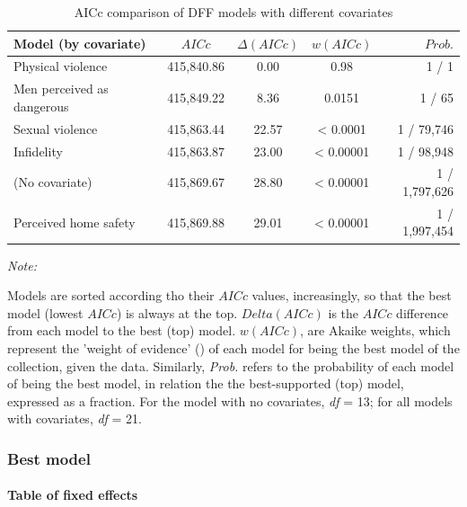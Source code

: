 \documentclass[
  bookmarksnumbered]{article}
\begin{document}
\begin{table}[H]
\centering
\caption{\label{tab:comp-m1}AICc comparison of DFF models with different covariates}
\centering
\begin{threeparttable}
\begin{tabular}[t]{lcccr}
\toprule
Model (by covariate) & $AICc$ & $\Delta(AICc)$ & $w(AICc)$ & $Prob.$\\
\midrule
Physical violence & 415,840.86 & 0.00 & 0.98 & 1 / 1\\
Men perceived as dangerous & 415,849.22 & 8.36 & 0.0151 & 1 / 65\\
Sexual violence & 415,863.44 & 22.57 & < 0.0001 & 1 / 79,746\\
Infidelity & 415,863.87 & 23.00 & < 0.00001 & 1 / 98,948\\
(No covariate) & 415,869.67 & 28.80 & < 0.00001 & 1 / 1,797,626\\
Perceived home safety & 415,869.88 & 29.01 & < 0.00001 & 1 / 1,997,454\\
\bottomrule
\end{tabular}
\begin{tablenotes}[para]
\item \textit{Note: } 
\item Models are sorted according tho their $AICc$ values, increasingly, 
             so that the best model (lowest $AICc$) is always at the top. 
             $Delta(AICc)$ is the $AICc$ difference from each model to the best (top) model. 
             $w(AICc)$, are Akaike weights, which represent the 'weight of evidence'
             (\cite{portetPrimerModelSelection2020}) of each model for being the best model 
             of the collection, given the data. 
             Similarly, \textit{Prob.} refers to the probability of each model of being the 
             best model, in relation the the best-supported (top) model, expressed as a 
             fraction. For the model with no covariates, \textit{df} = 13; for all models 
             with covariates, \textit{df} = 21.
\end{tablenotes}
\end{threeparttable}
\end{table}

\subsubsection{Best model}\label{best-model}

\paragraph{Table of fixed effects}\label{table-of-fixed-effects-4}
\end{document}
